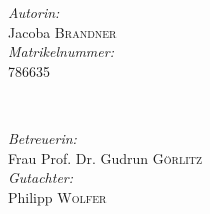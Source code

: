 \begin{titlepage}
\begin{minipage}{0.4\textwidth}
\begin{flushleft} \large
\emph{Autorin:}\\
Jacoba \textsc{Brandner} \\
\emph{Matrikelnummer:}\\
786635
\end{flushleft}
\end{minipage}
~
\begin{minipage}{0.45\textwidth}
\begin{flushright} \large
\emph{Betreuerin:} \\
Frau Prof. Dr. Gudrun \textsc{Görlitz} \\
\emph{Gutachter:} \\
Philipp \textsc{Wolfer} \\
\end{flushright}
\end{minipage}\\





\vfill %

\end{titlepage}
